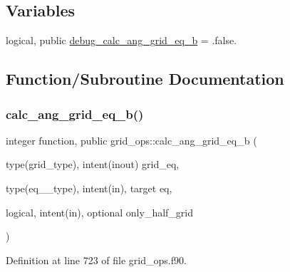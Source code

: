 \subsection*{Variables}
\begin{DoxyCompactItemize}
\item 
logical, public \hyperlink{namespacegrid__ops_ad043ab1b07b2d251bb7596b8c8d2f960}{debug\+\_\+calc\+\_\+ang\+\_\+grid\+\_\+eq\+\_\+b} = .false.
\end{DoxyCompactItemize}


\subsection{Function/\+Subroutine Documentation}
\mbox{\label{namespacegrid__ops_a06107dbdfd1dd62e372cc29ab0255bad}} 
\subsubsection{\texorpdfstring{calc\+\_\+ang\+\_\+grid\+\_\+eq\+\_\+b()}{calc\_ang\_grid\_eq\_b()}}
{\footnotesize\ttfamily integer function, public grid\+\_\+ops\+::calc\+\_\+ang\+\_\+grid\+\_\+eq\+\_\+b (\begin{DoxyParamCaption}\item[{type(grid\+\_\+type), intent(inout)}]{grid\+\_\+eq,  }\item[{type(eq\+\_\+1\+\_\+type), intent(in), target}]{eq,  }\item[{logical, intent(in), optional}]{only\+\_\+half\+\_\+grid }\end{DoxyParamCaption})}



Definition at line 723 of file grid\+\_\+ops.\+f90.

